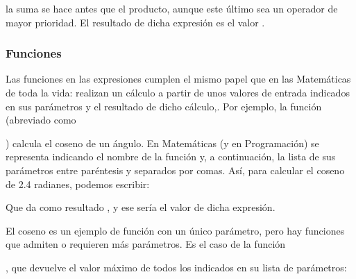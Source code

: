 \documentclass[a4paper,12pt,spanish]{sphinxmanual}
\begin{document}
\begin{sphinxVerbatim}[commandchars=\\\{\}]
    
\end{sphinxVerbatim}

la suma se hace antes que el producto, aunque este último sea un operador de
mayor prioridad. El resultado de dicha expresión es el valor .

\ignorespaces 

\subsubsection{Funciones}
\label{\detokenize{php:funciones}}\label{\detokenize{php:index-10}}
Las funciones en las expresiones cumplen el mismo papel que en las Matemáticas
de toda la vida: realizan un cálculo a partir de unos valores de entrada
indicados en sus parámetros y  el resultado de dicho cálculo,. Por
ejemplo, la función  (abreviado como %
\begin{footnote}[3]\sphinxAtStartFootnote
{}
%
\end{footnote}) calcula el coseno de un
ángulo. En Matemáticas (y en Programación) se representa indicando el nombre de
la función y, a continuación, la lista de sus parámetros entre paréntesis y
separados por comas. Así, para calcular el coseno de 2.4 radianes, podemos
escribir:

\begin{sphinxVerbatim}[commandchars=\\\{\}]
\end{sphinxVerbatim}

Que da como resultado , y ese sería el valor de dicha
expresión.

El coseno es un ejemplo de función con un único parámetro, pero hay funciones
que admiten o requieren más parámetros. Es el caso de la función %
\begin{footnote}[4]\sphinxAtStartFootnote
{}
%
\end{footnote}, que
devuelve el valor máximo de todos los indicados en su lista de parámetros:
\end{document}
